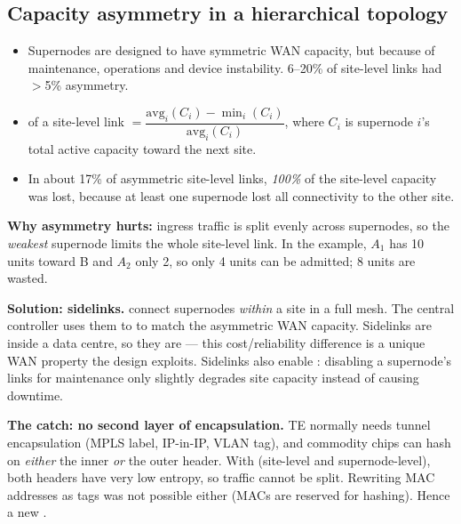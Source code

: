 \subsection{Capacity asymmetry in a hierarchical topology}
\begin{itemize}
\item Supernodes are designed to have symmetric WAN capacity, but  because of maintenance, operations and device instability. 6--20\% of site-level links had $>$5\% asymmetry.
\item {} of a site-level link $=\dfrac{\text{avg}_i(C_i)-\min_i(C_i)}{\text{avg}_i(C_i)}$, where $C_i$ is supernode $i$'s total active capacity toward the next site.
\item In about 17\% of asymmetric site-level links, \emph{100\%} of the site-level capacity was lost, because at least one supernode lost all connectivity to the other site.
\end{itemize}
\textbf{Why asymmetry hurts:} ingress traffic is split evenly across supernodes, so the \emph{weakest} supernode limits the whole site-level link. In the example, $A_1$ has 10 units toward B and $A_2$ only 2, so only 4 units can be admitted; 8 units are wasted.

\textbf{Solution: sidelinks.}  connect supernodes \emph{within} a site in a full mesh. The central controller uses them to  to match the asymmetric WAN capacity. Sidelinks are inside a data centre, so they are  --- this cost/reliability difference is a unique WAN property the design exploits. Sidelinks also enable : disabling a supernode's links for maintenance only slightly degrades site capacity instead of causing downtime.

\textbf{The catch: no second layer of encapsulation.} TE normally needs tunnel encapsulation (MPLS label, IP-in-IP, VLAN tag), and commodity chips can hash on \emph{either} the inner \emph{or} the outer header. With  (site-level and supernode-level), both headers have very low entropy, so traffic cannot be split. Rewriting MAC addresses as tags was not possible either (MACs are reserved for hashing). Hence a new .

